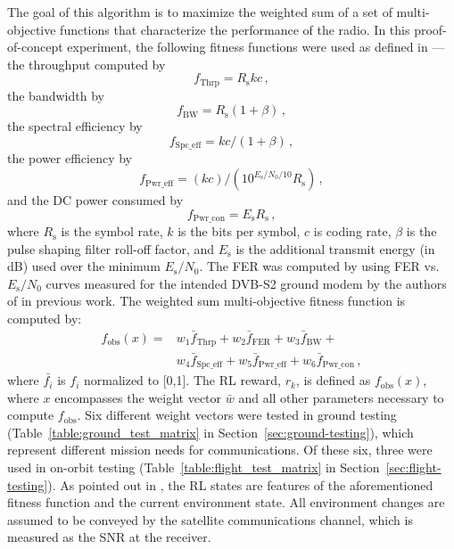 \documentclass[journal]{IEEEtran}
\begin{document}
The goal of this algorithm is to maximize the weighted sum of a set of multi-objective functions that characterize the performance of the radio.  In this proof-of-concept experiment, the following fitness functions were used as defined in \cite{paulo-jrnl}---the throughput computed by
\begin{equation}
f_\mathrm{Thrp} = R_\mathrm{s} k c\,,
\end{equation}
the bandwidth by
\begin{equation}
f_\mathrm{BW} = R_\mathrm{s}(1+\beta)\,,
\end{equation}
the spectral efficiency by
\begin{equation}
f_\mathrm{Spc\_eff} = kc/(1+\beta)\,,
\end{equation}
the power efficiency by
\begin{equation}
f_\mathrm{Pwr\_eff} = (kc)/(10^{E_\mathrm{s}/N_\mathrm{0}/10}R_\mathrm{s})\,,
\end{equation}
and the DC power consumed by
\begin{equation}
f_\mathrm{Pwr\_con} = E_\mathrm{s} R_\mathrm{s}\,,
\end{equation}
where $R_\mathrm{s}$ is the symbol rate, $k$ is the bits per symbol, $c$ is coding rate, $\beta$ is the pulse shaping filter roll-off factor, and $E_\mathrm{s}$ is the additional transmit energy (in dB) used over the minimum $E_\mathrm{s}/N_\mathrm{0}$.  The FER was computed by using FER vs. $E_\mathrm{s}/N_\mathrm{0}$ curves measured for the intended DVB-S2 ground modem by the authors of \cite{downey-paper} in previous work.  The weighted sum multi-objective fitness function is computed by:
\begin{equation}
\begin{split}
f_\mathrm{obs}(x) = &w_1 \bar{f}_\mathrm{Thrp} + w_2 \bar{f}_\mathrm{FER} + w_3 \bar{f}_\mathrm{BW} + \\
&w_4 \bar{f}_\mathrm{Spc\_eff} + w_5 \bar{f}_\mathrm{Pwr\_eff} + w_6 \bar{f}_\mathrm{Pwr\_con}\,,
\end{split}
\end{equation} 
where $\bar{f_i}$ is $f_i$ normalized to [0,1].  The RL reward, $r_k$, is defined as $f_\mathrm{obs}(x)$, where $x$ encompasses the weight vector $\bar{w}$ and all other parameters necessary to compute $f_\mathrm{obs}$.  Six different weight vectors were tested in ground testing (Table~\ref{table:ground_test_matrix} in Section~\ref{sec:ground-testing}), which represent different mission needs for communications.  Of these six, three were used in on-orbit testing (Table~\ref{table:flight_test_matrix} in Section~\ref{sec:flight-testing}).  As pointed out in \cite{paulo-jrnl}, the RL states are features of the aforementioned fitness function and the current environment state.  All environment changes are assumed to be conveyed by the satellite communications channel, which is measured as the SNR at the receiver.
\end{document}
